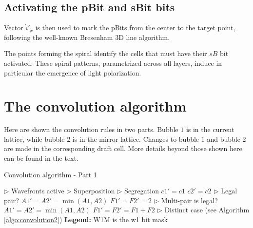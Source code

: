 \documentclass[12pt]{article}
\begin{document}
\subsection{Activating the pBit and sBit bits}
Vector $\hat{i}'_x$ is then used to mark the pBits from the center to the target point, following the well-known Bresenham 3D line algorithm. 

The points forming the spiral identify the cells that must have their $sB$ bit activated. These spiral patterns, parametrized across all layers, induce in particular the emergence of light polarization.

\newpage{}

\section{The convolution algorithm \label{sec:algorithms}}
Here are shown the convolution rules in two parts. Bubble $1$ is in the current lattice, while bubble $2$ is in the mirror lattice. Changes to bubble $1$ and bubble $2$ are made in the corresponding draft cell. More details beyond those shown here can be found in the text.

\begin{algorithm}
    \caption{Convolution algorithm - Part 1}
    \label{algo:convolution1}
    \begin{algorithmic}[1]
            \State $\triangleright$ Wavefronts active 
                \State $\triangleright$ Superposition
                    \State $\triangleright$ Segregation
                        \State $c1'=c1$
                    \EndIf   
                        \State $c2'=c2$
                    \EndIf   
                    \State $\triangleright$ Legal pair?
                        \State $A1'=A2'=\min(A1, A2)$
                        \State $F1'=F2'=2$
                    \EndIf   
                    \State $\triangleright$ Multi-pair is legal?
                        \State $A1'=A2'=\min(A1, A2)$
                        \State $F1'=F2'=F1+F2$
                    \EndIf   
                \EndIf   
            \Else
                \State $\triangleright$ Distinct case
                \State (see Algorithm \ref{algo:convolution2})
            \EndIf   
        \EndIf   
        \State  %
        \State \textbf{Legend:}
        \State W1M is the w1 bit mask

    \end{algorithmic}
\end{algorithm}
\end{document}
